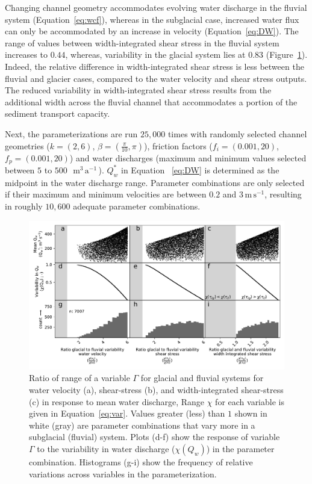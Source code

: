 \documentclass[11pt]{article}
\newcommand{\mmma}{$\,\mathrm{m^3\, a^{-1}}$\,}
\newcommand{\unit}[1]{$\mathrm{#1}$}
\begin{document}
\begin{spacing}{1}
  Changing channel geometry accommodates evolving water discharge in the fluvial system (Equation~\ref{eq:wcf}), whereas in the subglacial case, increased water flux can only be accommodated by an increase in velocity (Equation~\ref{eq:DW}).
  The range of values between width-integrated shear stress in the fluvial system increases to $0.44$, whereas, variability in the glacial system lies at $0.83$ (Figure~\ref{fig:range}).
  Indeed, the relative  difference in width-integrated shear stress is less between the fluvial and glacier cases, compared to the water velocity and shear stress outputs.
  The reduced variability in width-integrated shear stress results from the additional width across the fluvial channel that accommodates a portion of the sediment transport capacity.
  
  Next, the parameterizations are run $25,000$ times with randomly selected channel geometries ($k=(2,6)$, $\beta=(\frac{\pi}{10},\pi)$), friction factors ($f_i=(0.001,20)$, $f_p=(0.001,20)$) and water discharges (maximum and minimum values selected between $5$ to $500$ \,\mmma). $Q_w^*$ in Equation ~\ref{eq:DW} is determined as the midpoint in the water discharge range. Parameter combinations are only selected if their maximum and minimum velocities are between $0.2$ and $3$\,\unit{m}\,\unit{s}$^{-1}$, resulting in roughly $10,600$ adequate parameter combinations. 
  
  
  \begin{center}
    \begin{figure}[H]
      \includegraphics[width=0.9\linewidth]{multi_run.pdf}
      \caption{Ratio of range of a variable $\Gamma$ for glacial and fluvial systems for water velocity  (a), shear-stress (b), and  width-integrated shear-stress (c) in response to mean water discharge,
        Range  $\chi$ for each variable is given in Equation~\ref{eq:var}. Values greater (less) than $1$ shown in white (gray) are parameter combinations that vary more in a subglacial (fluvial) system. Plots (d-f) show the response of variable $\Gamma$ to the variability in water discharge ($\chi(Q_w)$) in the parameter combination. 
        Histograms (g-i) show the frequency of relative variations across variables in the parameterization.}
      \label{fig:range}
    \end{figure}
  \end{center}
  

\end{spacing}
\end{document}
